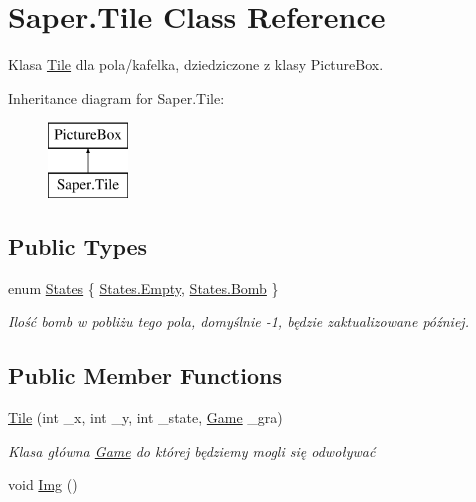 \hypertarget{class_saper_1_1_tile}{}\section{Saper.\+Tile Class Reference}
\label{class_saper_1_1_tile}


Klasa \mbox{\hyperlink{class_saper_1_1_tile}{Tile}} dla pola/kafelka, dziedziczone z klasy Picture\+Box.  


Inheritance diagram for Saper.\+Tile\+:\begin{figure}[H]
\begin{center}
\leavevmode
\includegraphics[height=2.000000cm]{class_saper_1_1_tile}
\end{center}
\end{figure}
\subsection*{Public Types}
\begin{DoxyCompactItemize}
\item 
enum \mbox{\hyperlink{class_saper_1_1_tile_a4318bc08fbfd24d56ffa8ea1359d845c}{States}} \{ \mbox{\hyperlink{class_saper_1_1_tile_a4318bc08fbfd24d56ffa8ea1359d845cace2c8aed9c2fa0cfbed56cbda4d8bf07}{States.\+Empty}}, 
\mbox{\hyperlink{class_saper_1_1_tile_a4318bc08fbfd24d56ffa8ea1359d845cacd3abfc2f377a4c3fd9181f919d9de82}{States.\+Bomb}}
 \}
\begin{DoxyCompactList}\small\item\em Ilość bomb w pobliżu tego pola, domyślnie -\/1, będzie zaktualizowane później. \end{DoxyCompactList}\end{DoxyCompactItemize}
\subsection*{Public Member Functions}
\begin{DoxyCompactItemize}
\item 
\mbox{\hyperlink{class_saper_1_1_tile_a5225a6086870b9c2c9cad42ae248be68}{Tile}} (int \+\_\+x, int \+\_\+y, int \+\_\+state, \mbox{\hyperlink{class_saper_1_1_game}{Game}} \+\_\+gra)
\begin{DoxyCompactList}\small\item\em Klasa główna \mbox{\hyperlink{class_saper_1_1_game}{Game}} do której będziemy mogli się odwoływać \end{DoxyCompactList}\item 
void \mbox{\hyperlink{class_saper_1_1_tile_a5d81eaa0b173ccb79598393706087e6d}{Img}} ()
\end{DoxyCompactItemize}
